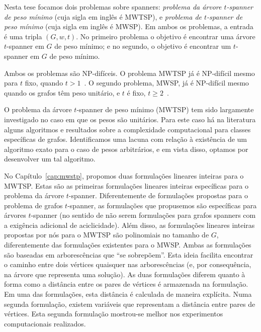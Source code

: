 Nesta tese focamos dois problemas sobre spanners: \emph{problema da árvore $t$-spanner de  peso mínimo} (cuja sigla em inglês é MWTSP), e \emph{problema de $t$-spanner de peso mínimo} (cuja sigla em inglês é MWSP). Em ambos os problemas, a entrada é uma tripla $(G,w,t)$.
No primeiro problema o objetivo é encontrar uma árvore $t$-spanner em $G$ de peso mínimo; e no segundo, o objetivo é encontrar um $t$-spanner em $G$ de peso mínimo. 

Ambos os problemas são NP-difíceis. O problema MWTSP já é NP-difícil mesmo para $t$ fixo, quando $t > 1$~\cite{CaiC1995}. O segundo problema, MWSP, já é NP-difícil mesmo quando os grafos têm peso unitário, e $t$ é fixo, $t \ge 2$~\cite{Cai1994}.

O problema da árvore $t$-spanner de peso mínimo (MWTSP) tem sido largamente investigado no caso em que os pesos são unitários. Para este caso há na literatura alguns algoritmos e resultados sobre a complexidade computacional para classes específicas de grafos. Identificamos uma lacuna com relação à existência de um algoritmo exato para o caso de pesos arbitrários, e em vista disso, optamos por desenvolver um tal algoritmo. 


No Capítulo~\ref{cap:mwstp}, propomos duas formulações lineares inteiras para o MWTSP.
Estas são as primeiras formulações lineares inteiras específicas
  para o problema da árvore $t$-spanner. Diferentemente de formulações
  propostas para o problema de grafos $t$-spanner, as formulações que 
  propusemos são  específicas para  árvores $t$-spanner (no sentido de não serem formulações para grafos spanners com a exigência adicional de aciclicidade).  Além disso, as formulações lineares inteiras propostas por nós
  para o MWTSP  são polinomiais no tamanho de $G$, diferentemente das formulações existentes
para o MWSP.
Ambas as formulações são baseadas em arborescências que ``se sobrepõem''. Esta ideia facilita encontrar o caminho entre dois vértices quaisquer nas arborescências (e, por consequência, na árvore que representa uma solução). As duas formulações diferem quanto à forma como a distância entre os pares de vértices é armazenada na formulação.  Em uma das formulações, esta distância é calculada de maneira explícita.  Numa segunda formulação, existem variáveis que representam a distância entre pares de vértices. Esta segunda formulação mostrou-se melhor nos experimentos computacionais realizados. 

